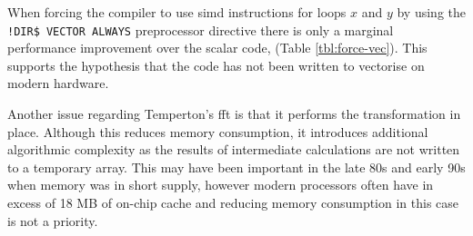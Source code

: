 \documentclass[a4paper,11pt]{report}
\begin{document}
\par
When forcing the compiler to use \gls{simd} instructions for loops $x$ and $y$ by using the \texttt{!DIR\$ VECTOR ALWAYS} preprocessor directive there is only a marginal performance improvement over the scalar code, (Table \ref{tbl:force-vec}). This supports the hypothesis that the code has not been written to vectorise on modern hardware. 
\par
Another issue regarding Temperton's \gls{fft} is that it performs the transformation in place. Although this reduces memory consumption, it introduces additional algorithmic complexity as the results of intermediate calculations are not written to a temporary array. This may have been important in the late 80s and early 90s when memory was in short supply, however modern processors often have in excess of 18 MB of on-chip cache and reducing memory consumption in this case is not a priority. 


\end{document}

